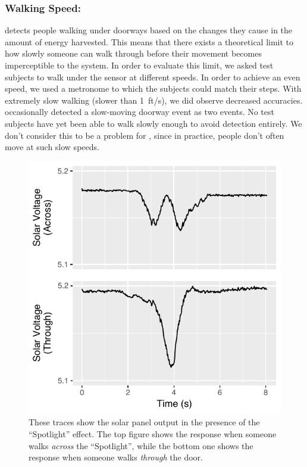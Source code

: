 \subsubsection{Walking Speed:}
\sysname detects people walking under doorways based on the changes they cause in the amount of energy harvested.
This means that there exists a theoretical limit to how slowly someone can walk through before their movement becomes imperceptible to the system.
In order to evaluate this limit, we asked test subjects to walk under the sensor at different speeds.
In order to achieve an even speed, we used a metronome to which the subjects could match their steps.
With extremely slow walking (slower than 1~ft/s), we did observe decreased accuracies.
\sysname occasionally detected a slow-moving doorway event as two events.
No test subjects have yet been able to walk slowly enough to avoid detection entirely.
We don't consider this to be a problem for \sysname, since in practice, people don't often move at such slow speeds.


\begin{figure}[t]
    \includegraphics[width=\columnwidth]{figs/spotlight.pdf}
    \caption{ These traces show the solar panel output in the presence of the ``Spotlight'' effect. The top figure shows the response when someone walks \textit{across} the ``Spotlight'', while the bottom one shows the response when someone walks \textit{through} the door.}
    \label{fig:spotlight}
\end{figure}

